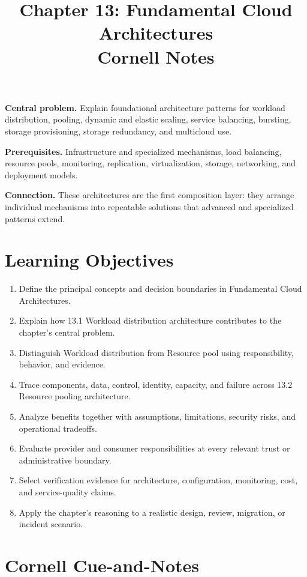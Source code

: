 \documentclass[11pt]{article}
\title{Chapter 13: Fundamental Cloud Architectures\\[2mm]\large Cornell Notes}
\author{}
\date{}
\begin{document}
\maketitle
\thispagestyle{fancy}
\vspace{-1.5em}
\begin{orientationbox}
\textbf{Central problem.} Explain foundational architecture patterns for workload distribution, pooling, dynamic and elastic scaling, service balancing, bursting, storage provisioning, storage redundancy, and multicloud use.\par\smallskip
\textbf{Prerequisites.} Infrastructure and specialized mechanisms, load balancing, resource pools, monitoring, replication, virtualization, storage, networking, and deployment models.\par\smallskip
\textbf{Connection.} These architectures are the first composition layer: they arrange individual mechanisms into repeatable solutions that advanced and specialized patterns extend.
\end{orientationbox}
\section{Learning Objectives}
\begin{enumerate}
\item Define the principal concepts and decision boundaries in Fundamental Cloud Architectures.
\item Explain how 13.1 Workload distribution architecture contributes to the chapter's central problem.
\item Distinguish Workload distribution from Resource pool using responsibility, behavior, and evidence.
\item Trace components, data, control, identity, capacity, and failure across 13.2 Resource pooling architecture.
\item Analyze benefits together with assumptions, limitations, security risks, and operational tradeoffs.
\item Evaluate provider and consumer responsibilities at every relevant trust or administrative boundary.
\item Select verification evidence for architecture, configuration, monitoring, cost, and service-quality claims.
\item Apply the chapter's reasoning to a realistic design, review, migration, or incident scenario.
\end{enumerate}
\section{Cornell Cue-and-Notes}
\end{document}
